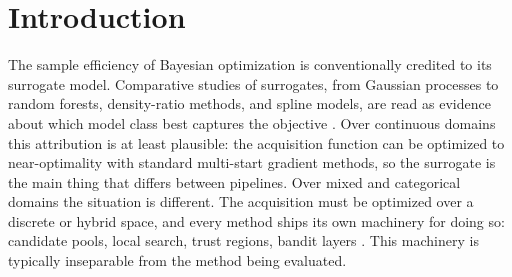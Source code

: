 \documentclass[%
 aip,
 amsmath,amssymb,
 floatfix,
 reprint,%
]{revtex4-1}
\begin{document}
\begin{abstract}
caps what perfect guidance can attain: restricted loses to permissive on 25
of 25 paired seeds ($p = 6.0\times10^{-8}$), and the shortfall worsens by
factors of 8 to 14 as the pool shrinks. Encoding-level duplicate detection
lets a GP re-spend about two thirds of its budget on known combinations and
miss an optimum it otherwise always finds on 5 of 25 seeds. We prove the
audit is a genuine ceiling for exogenous candidate pools, and state the
adaptive case, which covers the pipelines we run, as an explicit
conjecture, and derive a monotone decay law for selection quality
under noisy guidance. We release \texttt{bo-audit}, the objective wrapper
behind the ecosystem audit, together with a disclosure checklist for
machinery-controlled comparisons: shared schema-aware proposals,
combination-level deduplication, paired seeds, per-seed win statistics, and
reported excess-over-pigeonhole revisit counts.
\end{abstract}

\maketitle

\section{Introduction}


The sample efficiency of Bayesian optimization is conventionally credited to
its surrogate model. Comparative studies of surrogates, from Gaussian
processes to random forests, density-ratio methods, and spline models, are
read as evidence about which model class best captures the objective
\cite{Snoek_Larochelle_Adams_2012, bergstra2011algorithms}. Over continuous
domains this attribution is at least plausible: the acquisition function can
be optimized to near-optimality with standard multi-start gradient methods,
so the surrogate is the main thing that differs between pipelines. Over
mixed and categorical domains the situation is different. The acquisition
must be optimized over a discrete or hybrid space, and every method ships
its own machinery for doing so: candidate pools, local search, trust
regions, bandit layers \cite{hutter2011sequential, ru2020cocabo,
wan2021think}. This machinery is typically inseparable from the method being
evaluated.
\end{document}
